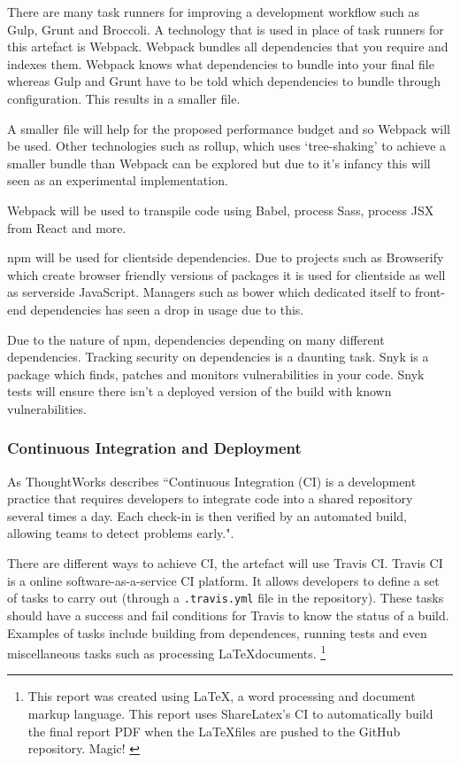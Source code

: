 There are many task runners for improving a development workflow such as Gulp, Grunt and Broccoli. A technology that is used in place of task runners for this artefact is Webpack. Webpack bundles all dependencies that you require and indexes them. Webpack knows what dependencies to bundle into your final file whereas Gulp and Grunt have to be told which dependencies to bundle through configuration. This results in a smaller file. \cite{webpack}

A smaller file will help for the proposed performance budget and so Webpack will be used. Other technologies such as rollup, which uses `tree-shaking' to achieve a smaller bundle than Webpack can be explored but due to it's infancy this will seen as an experimental implementation. \cite{rollup}

Webpack will be used to transpile code using Babel, process Sass, process JSX from React and more.

npm will be used for clientside dependencies. Due to projects such as Browserify which create browser friendly versions of packages it is used for clientside as well as serverside JavaScript. \cite{browserify} Managers such as bower which dedicated itself to front-end dependencies has seen a drop in usage due to this. \cite{bower}

Due to the nature of npm, dependencies depending on many different dependencies. Tracking security on dependencies is a daunting task. Snyk is a package which finds, patches and monitors vulnerabilities in your code. \cite{snyk} Snyk tests will ensure there isn't a deployed version of the build with known vulnerabilities.

\subsubsection{Continuous Integration and Deployment} \label{a-d--continuous-integration}

As ThoughtWorks describes ``Continuous Integration (CI) is a development practice that requires developers to integrate code into a shared repository several times a day. Each check-in is then verified by an automated build, allowing teams to detect problems early.". \cite{continuous_integration}

There are different ways to achieve CI, the artefact will use Travis CI. Travis CI is a online software-as-a-service CI platform. It allows developers to define a set of tasks to carry out (through a \verb|.travis.yml| file in the repository). These tasks should have a success and fail conditions for Travis to know the status of a build. Examples of tasks include building from dependences, running tests and even miscellaneous tasks such as processing \LaTeX documents. \footnote{This report was created using \LaTeX, a word processing and document markup language. \cite{latex} This report uses ShareLatex's CI to automatically build the final report PDF when the \LaTeX files are pushed to the GitHub repository. Magic! \cite{sharelatex}}

